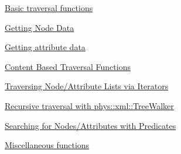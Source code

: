 \begin{DoxyItemize}
\item \hyperlink{XMLManual_XMLAccessingBasics}{Basic traversal functions}
\item \hyperlink{XMLManual_XMLAccessingNodeData}{Getting Node Data}
\item \hyperlink{XMLManual_XMLAccessingAttributeData}{Getting attribute data}
\item \hyperlink{XMLManual_XMLAccessingContentBased}{Content Based Traversal Functions}
\item \hyperlink{XMLManual_XMLAccessingIterators}{Traversing Node/Attribute Lists via Iterators}
\item \hyperlink{XMLManual_XMLAccessingWalker}{Recursive traversal with phys::xml::TreeWalker}
\item \hyperlink{XMLManual_XMLAccessingPredicates}{Searching for Nodes/Attributes with Predicates}
\item \hyperlink{XMLManual_XMLAccessingMisc}{Miscellaneous functions}
\end{DoxyItemize}

